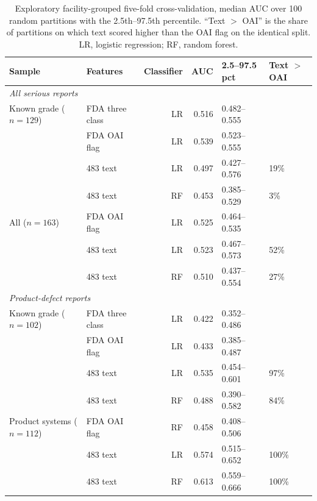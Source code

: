 \documentclass[12pt]{article}
\begin{document}
\begin{table}[ht]
\centering\small
\caption{Exploratory facility-grouped five-fold cross-validation, median AUC
over 100 random partitions with the 2.5th--97.5th percentile. ``Text $>$
OAI'' is the share of partitions on which text scored higher than the OAI
flag on the identical split. LR, logistic regression; RF, random forest.}
\label{tab:models}
\begin{tabular}{llrrll}\toprule
Sample & Features & Classifier & AUC & 2.5--97.5 pct & Text $>$ OAI \\\midrule
\multicolumn{6}{l}{\textit{All serious reports}} \\
Known grade ($n=129$) & FDA three class & LR & 0.516 & 0.482--0.555 & \\
 & FDA OAI flag & LR & 0.539 & 0.523--0.555 & \\
 & 483 text & LR & 0.497 & 0.427--0.576 & 19\% \\
 & 483 text & RF & 0.453 & 0.385--0.529 & 3\% \\
All ($n=163$) & FDA OAI flag & LR & 0.525 & 0.464--0.535 & \\
 & 483 text & LR & 0.523 & 0.467--0.573 & 52\% \\
 & 483 text & RF & 0.510 & 0.437--0.554 & 27\% \\\midrule
\multicolumn{6}{l}{\textit{Product-defect reports}} \\
Known grade ($n=102$) & FDA three class & LR & 0.422 & 0.352--0.486 & \\
 & FDA OAI flag & LR & 0.433 & 0.385--0.487 & \\
 & 483 text & LR & 0.535 & 0.454--0.601 & 97\% \\
 & 483 text & RF & 0.488 & 0.390--0.582 & 84\% \\
Product systems ($n=112$) & FDA OAI flag & RF & 0.458 & 0.408--0.506 & \\
 & 483 text & LR & 0.574 & 0.515--0.652 & 100\% \\
 & 483 text & RF & 0.613 & 0.559--0.666 & 100\% \\
\bottomrule\end{tabular}
\end{table}
\end{document}
